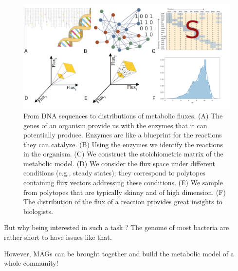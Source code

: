    \begin{figure}[!htbp]
      \includegraphics[width=1.0\columnwidth]{figures/flux_sampling_workflow.png}
      \caption{
         From DNA sequences to distributions of metabolic fluxes.
         (A) The genes of an organism provide us with the enzymes that it can potentially produce. Enzymes are like a blueprint for the reactions they can catalyze.
         (B) Using the enzymes we identify the reactions in the organism.
         (C) We construct the stoichiometric matrix of the metabolic  model.
         (D) We consider the flux space under different conditions (e.g., steady states);
         they correspond  to  polytopes containing flux vectors addressing these conditions.
         (E) We sample from polytopes that are typically skinny and of high dimension.
         (F) The distribution of the flux of a reaction provides  great insights
         to biologists.
      }
      \label{fig:sampling_workflow}
   \end{figure}

   But why being interested in such a task ? The genome of most bacteria are rather short to have issues like that. 

   However, MAGs can be brought together and build the metabolic model of a whole community! 



